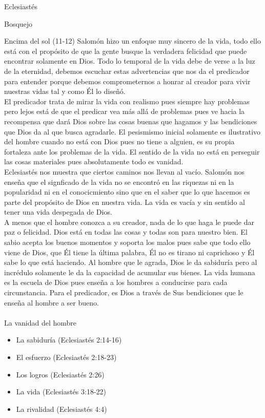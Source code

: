 \begin{section}{Eclesiastés}
\begin{subsection}{Bosquejo}
\begin{subsubsection}{Encima del sol (11-12)}
		Salomón hizo un enfoque muy sincero de la vida, todo ello está con el propósito de que la gente busque la verdadera felicidad que puede encontrar solamente en Dios. Todo lo temporal de la vida debe de verse a la luz de la eternidad, debemos escuchar estas advertencias que nos da el predicador para entender porque debemos comprometernos a honrar al creador para vivir nuestras vidas tal y como Él lo diseñó.\\
		El predicador trata de mirar la vida con realismo pues siempre hay problemas pero lejos está de que el predicar vea más allá de problemas pues ve hacia la recompensa que dará Dios sobre las cosas buenas que hagamos y las bendiciones que Dios da al que busca agradarle. El pesismismo inicial solamente es ilustrativo del hombre cuando no está con Dios pues no tiene a alguien, es su propia fortaleza ante los problemas de la vida. El sentido de la vida no está en perseguir las cosas materiales pues absolutamente todo es vanidad.\\
		Eclesiastés nos muestra que ciertos caminos nos llevan al vacío. Salomón nos enseña que el signficado de la vida no se encontró en las riquezas ni en la popularidad ni en el conocicmiento sino que en el saber que lo que hacemos es parte del propósito de Dios en nuestra vida. La vida es vacía y sin sentido al tener una vida despegada de Dios.\\
		A menos que el hombre conozca a su creador, nada de lo que haga le puede dar paz o felicidad. Dios está en todas las cosas y todas son para nuestro bien. El sabio acepta los buenos momentos y soporta los malos pues sabe que todo ello viene de Dios, que Él tiene la última palabra, Él no es tirano ni caprichoso y Él sabe lo que está haciendo. Al hombre que le agrada, Dios le da sabiduría pero al incrédulo solamente le da la capacidad de acumular sus bienes. La vida humana es la escuela de Dios pues enseña a los hombres a conducirse para cada circunstancia. Para el predicador, es Dios a través de Sus bendiciones que le enseña al hombre a ser bueno.\\
		\\
		La vanidad del hombre
		\begin{itemize}
			\item La sabiduría (Eclesiastés 2:14-16)
			\item El esfuerzo (Eclesiastés 2:18-23)
			\item Los logros (Eclesiastés 2:26)
			\item La vida (Eclesiastés 3:18-22)
			\item La rivalidad (Eclesiastés 4:4)

\end{itemize}
\end{subsubsection}
\end{subsection}
\end{section}
